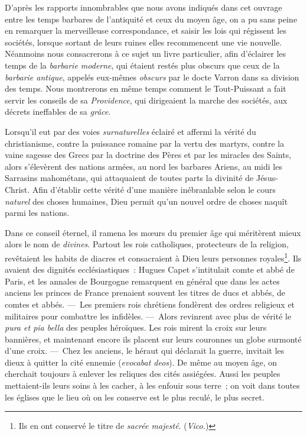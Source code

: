 \documentclass[french,twoside]{book} %
\newcommand\chaptercont{} %
\begin{document}
\chaptercont
\noindent  D’après les rapports innombrables que nous avons indiqués dans cet ouvrage entre les temps barbares de l’antiquité et ceux du moyen âge, on a pu sans peine en remarquer la merveilleuse correspondance, et saisir les lois qui régissent les sociétés, lorsque sortant de leurs ruines elles recommencent une vie nouvelle. Néanmoins nous consacrerons à ce sujet un livre particulier, afin d’éclairer les temps de la {\itshape barbarie moderne}, qui étaient restés plus obscurs que ceux de la {\itshape barbarie antique}, appelés eux-mêmes {\itshape obscurs} par le docte Varron dans sa division des temps. Nous montrerons en même temps comment le Tout-Puissant a fait servir les conseils de sa {\itshape Providence}, qui dirigeaient la marche des sociétés, aux décrets ineffables de sa {\itshape grâce}.\par
Lorsqu’il eut par des voies {\itshape surnaturelles} éclairé et affermi la vérité du christianisme, contre la puissance romaine par la vertu des martyrs, contre la  vaine sagesse des Grecs par la doctrine des Pères et par les miracles des Saints, alors s’élevèrent des nations armées, au nord les barbares Ariens, au midi les Sarrasins mahométans, qui attaquaient de toutes parts la divinité de Jésus-Christ. Afin d’établir cette vérité d’une manière inébranlable selon le cours {\itshape naturel} des choses humaines, Dieu permit qu’un nouvel ordre de choses naquît parmi les nations.\par
Dans ce conseil éternel, il ramena les mœurs du premier âge qui méritèrent mieux alors le nom de {\itshape divines}. Partout les rois catholiques, protecteurs de la religion, revêtaient les habits de diacres et consacraient à Dieu leurs personnes royales\footnote{Ils en ont conservé le titre de {\itshape sacrée majesté}. ({\itshape Vico.})}. Ils avaient des dignités ecclésiastiques : Hugues Capet s’intitulait comte et abbé de Paris, et les annales de Bourgogne remarquent en général que dans les actes anciens les princes de France prenaient souvent les titres de ducs et abbés, de comtes et abbés. — Les premiers rois chrétiens fondèrent des ordres religieux et militaires pour combattre les infidèles. — Alors revinrent avec plus de vérité le {\itshape pura et pia bella} des peuples héroïques. Les rois mirent la croix sur leurs bannières, et maintenant encore ils placent sur leurs couronnes un globe surmonté d’une croix. — Chez les anciens, le héraut qui déclarait la guerre, invitait les dieux à quitter la cité ennemie ({\itshape evocabat deos}). De même au moyen âge, on cherchait toujours à enlever les reliques des  cités assiégées. Aussi les peuples mettaient-ils leurs soins à les cacher, à les enfouir sous terre ; on voit dans toutes les églises que le lieu où on les conserve est le plus reculé, le plus secret.\par
\end{document}
